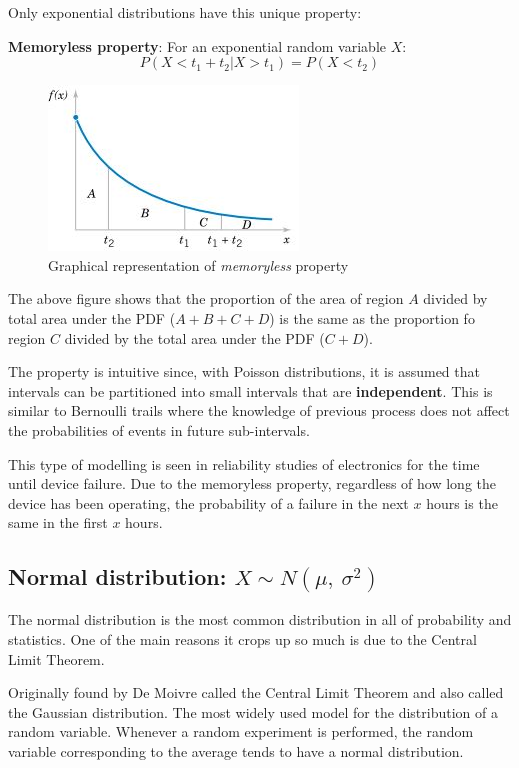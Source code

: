 \documentclass[10pt,a4paper]{article}
\begin{document}
Only exponential distributions have this unique property:
\\
\begin{tcolorbox}[breakable,colback=white]
\textbf{Memoryless property}: For an exponential random variable $X$:
$$
    P(X<t_1 + t_2 | X>t_1) = P(X<t_2)
$$
\end{tcolorbox}

\begin{figure} [h!]
    \centering
    \includegraphics[]{Memoryless.JPG}
    \caption{Graphical representation of \textit{memoryless} property}
\end{figure}
The above figure shows that the proportion of the area of region $A$ divided by total area under the PDF ($A+B+C+D$)
is the same as the proportion fo region $C$ divided by the total area under the PDF ($C+D$). 

The property is intuitive since, with Poisson distributions, it is assumed that intervals can be
partitioned into small intervals that are \textbf{independent}. This is similar to Bernoulli trails
where the knowledge of previous process does not affect the probabilities of events in future
sub-intervals.

This type of modelling is seen in reliability studies of electronics for the time until device
failure. Due to the memoryless property, regardless of how long the device has been operating, the
probability of a failure in the next $x$ hours is the same in the first $x$ hours.

\subsection{Normal distribution: $X \sim N(\mu,\: \sigma^2)$}

The normal distribution is the most common distribution in all of probability and statistics. One of the main reasons it crops up so much is due to the Central Limit Theorem.

Originally found by De Moivre called the Central Limit Theorem and also called the Gaussian
distribution. The most widely used model for the distribution of a random variable. Whenever a
random experiment is performed, the random variable corresponding to the average tends to have a
normal distribution. 
\end{document}
